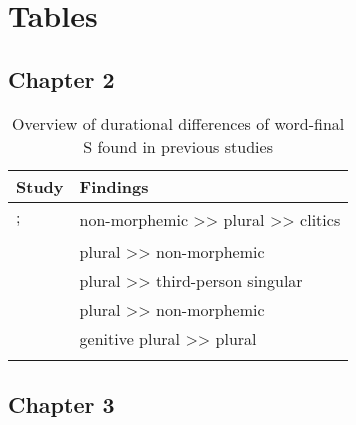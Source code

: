 
\section{Tables}

\subsection{Chapter 2}


\begin{table}[H]\fontsize{10}{11}
\caption{Overview of durational differences of word-final S found in previous studies}
\label{tab:2.1}
\begin{tabular}{ll}
\lsptoprule
Study                                & Findings                                         \\
\midrule
\cite{Zimmermann2016, Plag2017}; & \multirow{2}{*}{non-morphemic >>
plural >> clitics}  \\
\cite{Tomaschek2019}               &                                                  \\
\cite{Walsh1983}                  & plural >> non-morphemic                            \\
\cite{Hsieh1999}                   & plural >> third-person singular                    \\
\cite{Seyfarth2017}                & plural >> non-morphemic                            \\
\cite{Plag2017}                    & genitive plural >> plural                 \\
\lspbottomrule
\end{tabular}
\end{table}


\subsection{Chapter 3}

